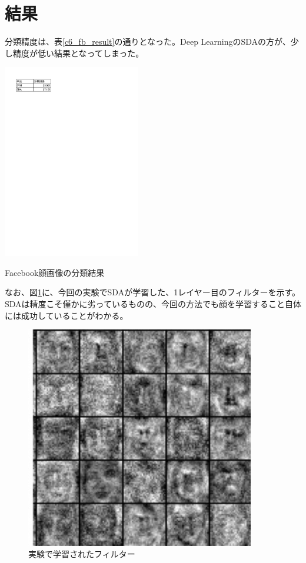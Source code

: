 \section{結果}
分類精度は、表\ref{c6_fb_result}の通りとなった。Deep LearningのSDAの方が、少し精度が低い結果となってしまった。\par
\begin{table}[tbp]
 \begin{center}
  \includegraphics[width=60mm]{img/c6/fb_result}
 \end{center}
 \caption{Facebook顔画像の分類結果}
 \label{c6_fb_result}
\end{table}
なお、図\ref{c6_filter}に、今回の実験でSDAが学習した、1レイヤー目のフィルターを示す。SDAは精度こそ僅かに劣っているものの、今回の方法でも顔を学習すること自体には成功していることがわかる。

\begin{figure}[tbp]
 \begin{center}
  \includegraphics[width=100mm]{img/c6/filter}
 \end{center}
 \caption{実験で学習されたフィルター}
 \label{c6_filter}
\end{figure}